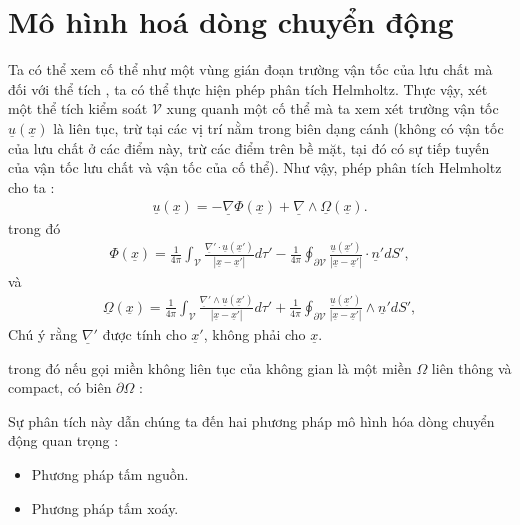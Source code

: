 \documentclass[KHI_DONG_HOC.tex]{subfiles}
\begin{document}
\section{Mô hình hoá dòng chuyển động}

Ta có thể xem cố thể như một vùng gián đoạn trường vận tốc của lưu chất mà đối với thể tích , ta có thể thực hiện phép phân tích Helmholtz. Thực vậy, xét một thể tích kiểm soát $\mathscr{V}$ xung quanh một cố thể mà ta xem xét trường vận tốc $\underline{u}(\underline{x})$ là liên tục, trừ tại các vị trí nằm trong biên dạng cánh (không có vận tốc của lưu chất ở các điểm này, trừ các điểm trên bề mặt, tại đó có sự tiếp tuyến của vận tốc lưu chất và vận tốc của cố thể). Như vậy, phép phân tích Helmholtz cho ta :
\begin{equation}
	\begin{aligned}
		\underline{u}(\underline{x})=-\underline{\nabla}\Phi(\underline{x})+\underline{\nabla}\wedge\underline{\Omega}(\underline{x}).
	\end{aligned}
\end{equation}
trong đó
\begin{equation}
	\begin{aligned}
		\Phi(\underline{x})=\frac{1}{4\pi}\int_\mathscr{V} \frac{\underline{\nabla}'\cdot\underline{u}(\underline{x}')}{|\underline{x}-\underline{x}'|}d\tau'-\frac{1}{4\pi}\oint_{\partial\mathscr{V}} \frac{\underline{u}(\underline{x}')}{|\underline{x}-\underline{x}'|}\cdot\underline{n}'dS',
	\end{aligned}
\end{equation}
và
\begin{equation}
	\begin{aligned}
		\underline{\Omega}(\underline{x})=\frac{1}{4\pi}\int_\mathscr{V} \frac{\underline{\nabla}'\wedge\underline{u}(\underline{x}')}{|\underline{x}-\underline{x}'|}d\tau'+\frac{1}{4\pi}\oint_{\partial\mathscr{V}} \frac{\underline{u}(\underline{x}')}{|\underline{x}-\underline{x}'|}\wedge\underline{n}'dS',
	\end{aligned}
\end{equation}
Chú ý rằng $\underline{\nabla}'$ được tính cho $\underline{x}'$, không phải cho $\underline{x}$.

trong đó nếu gọi miền không liên tục của không gian là một miền $\Omega$ liên thông và compact, có biên $\partial\Omega$ :


Sự phân tích này dẫn chúng ta đến hai phương pháp mô hình hóa dòng chuyển động quan trọng :
\begin{itemize}
	\item Phương pháp tấm nguồn.
	\item Phương pháp tấm xoáy.
\end{itemize}
\end{document}
